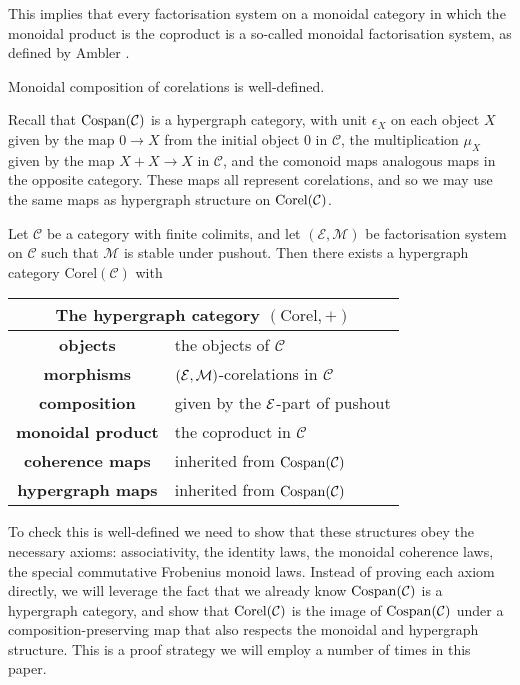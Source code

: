 This implies that every factorisation system on a monoidal category in which the
monoidal product is the coproduct is a so-called monoidal factorisation system,
as defined by Ambler \cite{Am}.
\begin{corollary}
  Monoidal composition of corelations is well-defined.
\end{corollary}




  Recall that $\operatorname{{Cospan}}(\mathcal C)$ is a hypergraph category, with unit
  $\epsilon_X$ on each object $X$ given by the map $0 \to X$ from the initial
  object $0$ in $\mathcal C$, the multiplication $\mu_X$ given by the map $X+X
  \to X$ in $\mathcal C$, and the comonoid maps analogous maps in the opposite
  category. These maps all represent corelations, and so we may use the same maps as
  hypergraph structure on $\operatorname{{Corel}}(\mathcal C)$.   

\begin{theorem} \label{thm.cospantocorel}
  Let $\mathcal C$ be a category with finite colimits, and let $(\mathcal E,
  \mathcal M)$ be factorisation system on $\mathcal C$ such that $\mathcal M$ is
  stable under pushout. Then there exists a hypergraph category
  $\mathrm{Corel}(\mathcal C)$ with 
  \begin{center}
    \begin{tabular}{| c | p{} |}
      \hline
      \multicolumn{2}{|c|}{The hypergraph category $(\mathrm{Corel},+)$} \\
      \hline
      \textbf{objects} & the objects of $\mathcal C$ \\ 
      \textbf{morphisms} & $(\mathcal E,\mathcal M)$-corelations in $\mathcal C$\\ 
      \textbf{composition} & given by the $\mathcal E$-part of pushout \\
      \textbf{monoidal product} & the coproduct in $\mathcal C$ \\
      \textbf{coherence maps} & inherited from $\operatorname{{Cospan}}(\mathcal C)$  \\
      \textbf{hypergraph maps} & inherited from $\operatorname{{Cospan}}(\mathcal C)$ \\
      \hline
    \end{tabular}
  \end{center}  
\end{theorem}

To check this is well-defined we need to show that these structures obey the
necessary axioms: associativity, the identity laws, the monoidal coherence laws,
the special commutative Frobenius monoid laws. Instead of proving each axiom
directly, we will leverage the fact that we already know $\operatorname{{Cospan}}(\mathcal C)$ is a
hypergraph category, and show that $\operatorname{{Corel}}(\mathcal C)$ is the image of $\operatorname{{Cospan}}(\mathcal
C)$ under a composition-preserving map that also respects the monoidal and
hypergraph structure. This is a proof strategy we will employ a number of times
in this paper.

